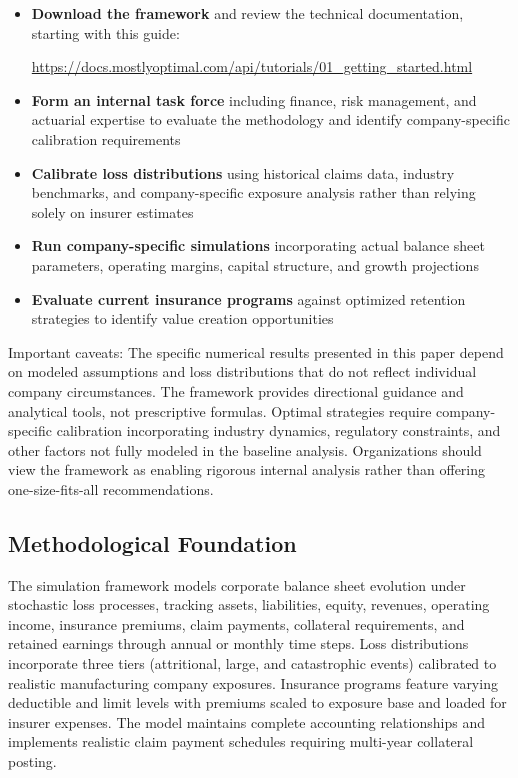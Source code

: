 \documentclass[11pt,letterpaper]{article}
\begin{document}
\begin{itemize}
    \item \textbf{Download the framework} and review the technical documentation, starting with this guide:

        \url{https://docs.mostlyoptimal.com/api/tutorials/01_getting_started.html}

    \item \textbf{Form an internal task force} including finance, risk management, and actuarial expertise to evaluate the methodology and identify company-specific calibration requirements
    \item \textbf{Calibrate loss distributions} using historical claims data, industry benchmarks, and company-specific exposure analysis rather than relying solely on insurer estimates
    \item \textbf{Run company-specific simulations} incorporating actual balance sheet parameters, operating margins, capital structure, and growth projections
    \item \textbf{Evaluate current insurance programs} against optimized retention strategies to identify value creation opportunities
\end{itemize}

Important caveats: The specific numerical results presented in this paper depend on modeled assumptions and loss distributions that do not reflect individual company circumstances. The framework provides directional guidance and analytical tools, not prescriptive formulas. Optimal strategies require company-specific calibration incorporating industry dynamics, regulatory constraints, and other factors not fully modeled in the baseline analysis. Organizations should view the framework as enabling rigorous internal analysis rather than offering one-size-fits-all recommendations.

\subsection{Methodological Foundation}

The simulation framework models corporate balance sheet evolution under stochastic loss processes, tracking assets, liabilities, equity, revenues, operating income, insurance premiums, claim payments, collateral requirements, and retained earnings through annual or monthly time steps. Loss distributions incorporate three tiers (attritional, large, and catastrophic events) calibrated to realistic manufacturing company exposures. Insurance programs feature varying deductible and limit levels with premiums scaled to exposure base and loaded for insurer expenses. The model maintains complete accounting relationships and implements realistic claim payment schedules requiring multi-year collateral posting.
\end{document}
